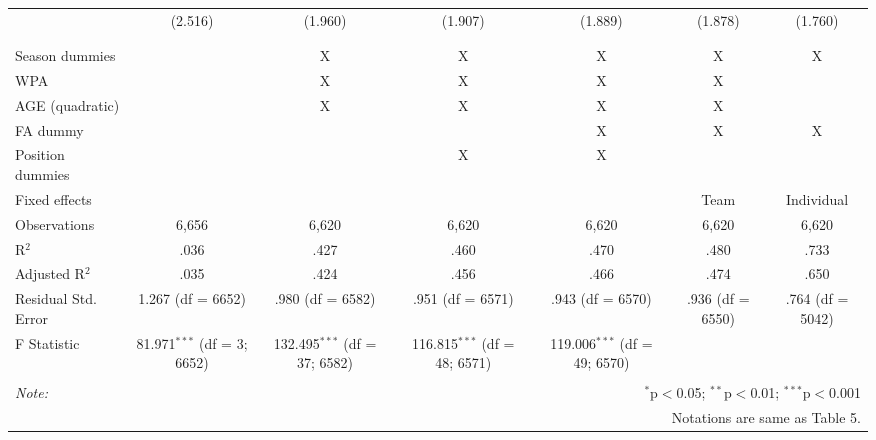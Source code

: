 \begin{table}[H]
\begin{tabular}{@{\extracolsep{5pt}}lcccccc}
  & (2.516) & (1.960) & (1.907) & (1.889) & (1.878) & (1.760) \\
  & & & & & & \\
\hline \\[-1.8ex]
Season dummies &  & X & X & X & X & X \\
WPA &  & X & X & X & X &  \\
AGE (quadratic) &  & X & X & X & X &  \\
FA dummy &  &  &  & X & X & X \\
Position dummies &  &  & X & X &  &  \\
Fixed effects &  &  &  &  & Team & Individual \\
Observations & 6,656 & 6,620 & 6,620 & 6,620 & 6,620 & 6,620 \\
R$^{2}$ & .036 & .427 & .460 & .470 & .480 & .733 \\
Adjusted R$^{2}$ & .035 & .424 & .456 & .466 & .474 & .650 \\
Residual Std. Error & 1.267 (df = 6652) & .980 (df = 6582) & .951 (df = 6571) & .943 (df = 6570) & .936 (df = 6550) & .764 (df = 5042) \\
F Statistic & 81.971$^{***}$ (df = 3; 6652) & 132.495$^{***}$ (df = 37; 6582) & 116.815$^{***}$ (df = 48; 6571) & 119.006$^{***}$ (df = 49; 6570) &  &  \\
\hline
\hline \\[-1.8ex]
\textit{Note:}  & \multicolumn{6}{r}{$^{*}$p$<$0.05; $^{**}$p$<$0.01; $^{***}$p$<$0.001} \\
& \multicolumn{6}{r}{Notations are same as Table 5.} \\
\end{tabular}
\end{table}
